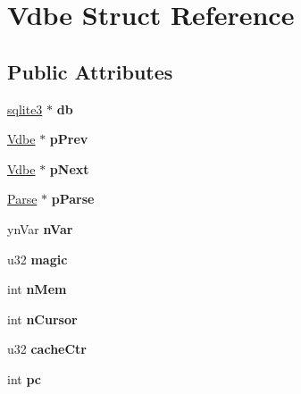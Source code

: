 \hypertarget{struct_vdbe}{}\section{Vdbe Struct Reference}
\label{struct_vdbe}
\subsection*{Public Attributes}
\begin{DoxyCompactItemize}
\item 
\mbox{\label{struct_vdbe_a495366101a593999f4d2ed905e839029}} 
\mbox{\hyperlink{structsqlite3}{sqlite3}} $\ast$ {\bfseries db}
\item 
\mbox{\label{struct_vdbe_a2afc3b6cd2f5b38d991148b809b3c53f}} 
\mbox{\hyperlink{struct_vdbe}{Vdbe}} $\ast$ {\bfseries p\+Prev}
\item 
\mbox{\label{struct_vdbe_a9d52c1a2d64f132c6994eeac00063df9}} 
\mbox{\hyperlink{struct_vdbe}{Vdbe}} $\ast$ {\bfseries p\+Next}
\item 
\mbox{\label{struct_vdbe_a90fc4cdcc206a8f62c18e860b78f5cda}} 
\mbox{\hyperlink{struct_parse}{Parse}} $\ast$ {\bfseries p\+Parse}
\item 
\mbox{\label{struct_vdbe_a2acd8f1fa65e19eb48fc62ddb6cb7569}} 
yn\+Var {\bfseries n\+Var}
\item 
\mbox{\label{struct_vdbe_a01c61f8cafa6ad3eaafcc85c6f53f8ef}} 
u32 {\bfseries magic}
\item 
\mbox{\label{struct_vdbe_a10a19309607617a75d3722219d3c7615}} 
int {\bfseries n\+Mem}
\item 
\mbox{\label{struct_vdbe_aa12a6a1075311bd5d89bc69eaefc6351}} 
int {\bfseries n\+Cursor}
\item 
\mbox{\label{struct_vdbe_ace5722464070f2055f536b737955b9ad}} 
u32 {\bfseries cache\+Ctr}
\item 
\mbox{\label{struct_vdbe_ae25264a36877487fb58814608a46689c}} 
int {\bfseries pc}

\end{DoxyCompactItemize}
